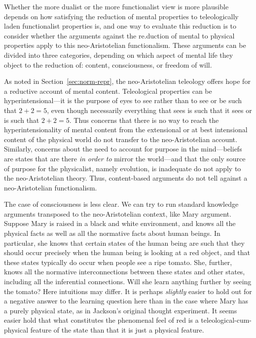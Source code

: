 Whether the more dualist or the more functionalist view is more plausible depends on how satisfying the reduction of mental
properties to teleologically laden functionalist properties is, and one way to evaluate this reduction is to consider
whether the arguments against the re.duction of mental to physical properties apply to this neo-Aristotelian functionalism.
These arguments can be divided into three categories, depending on which aspect of mental life they object to the reduction
of: content, consciousness, or freedom of will. 

As noted in Section~\ref{sec:norm-repr}, the neo-Aristotelian teleology offers hope for a reductive account of mental content. Teleological properties
can be hyperintensional---it is the purpose of eyes to see rather than to see or be such that $2+2=5$, even though necessarily
everything that sees is such that it sees or is such that $2+2=5$. Thus concerns that there is no way to reach the hyperintensionality
of mental content from the extensional or at best intensional content of the physical world do not transfer to the neo-Aristotelian
account. Similarly, concerns about the need to account for purpose in the mind---beliefs are states that are there 
\textit{in order to} mirror the world---and that the only source of purpose for the physicalist, namely evolution, is inadequate
do not apply to the neo-Aristotelian theory. Thus, content-based arguments do not tell against a neo-Aristotelian functionalism.

The case of consciousness is less clear. We can try to run standard knowledge arguments transposed to the neo-Aristotelian context, like  Mary argument.
Suppose Mary is raised in a black and white environment, and knows all the physical facts as well as all the normative facts about
human beings. In particular, she knows that certain states of the human being are such that they should occur precisely when the
human being is looking at a red object, and that these states typically do occur when people see a ripe tomato. She, further, knows all
the normative interconnections between these states and other states, including all the inferential connections. Will she learn anything
further by seeing the tomato? Here intuitions may differ. It is perhaps \textit{slightly} easier to hold out for a negative answer to the learning question
here than in the case where Mary has a purely physical state, as in Jackson's original thought experiment. It seems
easier hold that what constitutes the phenomenal feel of red is a teleological-cum-physical feature of the state
than that it is just a physical feature.

